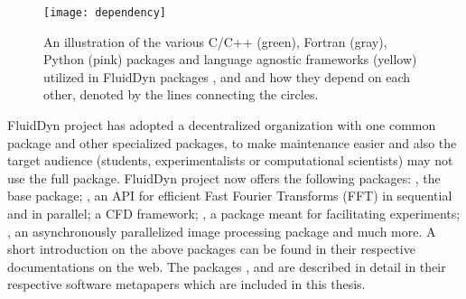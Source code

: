 \begin{figure}[h]
  \centering
  \texttt{[image: dependency]}
  \caption{An illustration of the various C/C++ (green), Fortran (gray), Python
  (pink) packages and language agnostic frameworks (yellow) utilized in
  FluidDyn packages ,  and  and
  how they depend on each other, denoted by the lines connecting the
  circles.}\label{fig:dependency}
\end{figure}

FluidDyn project has adopted a decentralized
organization with one common package and other specialized packages, to make
maintenance easier and also the target audience (students, experimentalists
or computational scientists) may not use the full package. FluidDyn project now
offers the following packages: ,
the base package; %
, an API for efficient Fast Fourier Transforms (FFT) in sequential and in
parallel; 
a CFD framework; , a package meant for
facilitating experiments; , an asynchronously parallelized
image processing package and much more.
%
A short introduction on the above packages can be found in their respective
documentations on the web. The packages , 
and  are described in detail in their respective software
metapapers
\citep[]{fluiddyn, fluidfft, fluidsim} which are included in this thesis.
